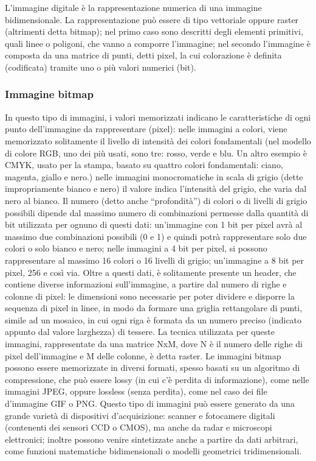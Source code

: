 L'immagine digitale è la rappresentazione numerica di una immagine
bidimensionale. La rappresentazione può essere di tipo vettoriale oppure
raster (altrimenti detta bitmap); nel primo caso sono descritti degli elementi
primitivi, quali linee o poligoni, che vanno a comporre l'immagine; nel
secondo l'immagine è composta da una matrice di punti, detti pixel, la cui
colorazione è definita (codificata) tramite uno o più valori numerici (bit).

\subsubsection{Immagine bitmap}

In questo tipo di immagini, i valori memorizzati indicano le caratteristiche
di ogni punto dell'immagine da rappresentare (pixel): nelle immagini a colori,
viene memorizzato solitamente il livello di intensità dei colori fondamentali
(nel modello di colore RGB, uno dei più usati, sono tre: rosso, verde e blu.
Un altro esempio è CMYK, usato per la stampa, basato su quattro colori
fondamentali: ciano, magenta, giallo e nero.) nelle immagini monocromatiche in
scala di grigio (dette impropriamente bianco e nero) il valore indica
l'intensità del grigio, che varia dal nero al bianco. Il numero (detto anche
``profondità'') di colori o di livelli di grigio possibili dipende dal massimo
numero di combinazioni permesse dalla quantità di bit utilizzata per ognuno di
questi dati: un'immagine con 1 bit per pixel avrà al massimo due combinazioni
possibili (0 e 1) e quindi potrà rappresentare solo due colori o solo bianco e
nero; nelle immagini a 4 bit per pixel, si possono rappresentare al massimo 16
colori o 16 livelli di grigio; un'immagine a 8 bit per pixel, 256 e così via.
Oltre a questi dati, è solitamente presente un header, che contiene diverse
informazioni sull'immagine, a partire dal numero di righe e colonne di pixel:
le dimensioni sono necessarie per poter dividere e disporre la sequenza di
pixel in linee, in modo da formare una griglia rettangolare di punti, simile
ad un mosaico, in cui ogni riga è formata da un numero preciso (indicato
appunto dal valore larghezza) di tessere. La tecnica utilizzata per queste
immagini, rappresentate da una matrice NxM, dove N è il numero delle righe di
pixel dell'immagine e M delle colonne, è detta raster. Le immagini bitmap
possono essere memorizzate in diversi formati, spesso basati su un algoritmo
di compressione, che può essere lossy (in cui c'è perdita di informazione),
come nelle immagini JPEG, oppure lossless (senza perdita), come nel caso dei
file d'immagine GIF o PNG. Questo tipo di immagini può essere generato da una
grande varietà di dispositivi d'acquisizione: scanner e fotocamere digitali
(contenenti dei sensori CCD o CMOS), ma anche da radar e microscopi
elettronici; inoltre possono venire sintetizzate anche a partire da dati
arbitrari, come funzioni matematiche bidimensionali o modelli geometrici
tridimensionali.


